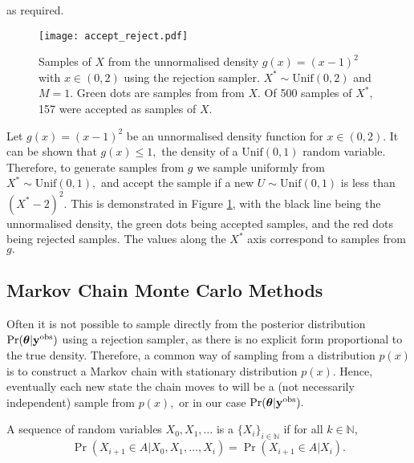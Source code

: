 as required.

\begin{figure}
    \centering
    \texttt{[image: accept\_reject.pdf]}
    \caption[{
        Samples from an unnormalised density using a rejection sampler
    }]{
        Samples of $X$ from the unnormalised density $g(x) = (x - 1)^2$ with
        $x\in(0,2)$ using the rejection sampler. $X^\ast\sim\mathrm{Unif}(0,2)$
        and $M = 1.$
        Green dots are samples from
        from $X.$
        Of 500 samples of $X^\ast$, 157 were accepted as samples of $X$.
    }
    \label{fig:accept_reject}
\end{figure}

\begin{example}
    Let $g(x) = (x - 1)^2$ be an unnormalised density function for
    $x \in (0,2).$ It can be shown that $g(x) \leq 1,$ 
    the density of a $\mathrm{Unif}(0,1)$ random
    variable. Therefore, to generate samples from $g$ we sample uniformly from
    $X^\ast \sim \mathrm{Unif}(0, 1),$ and accept the sample if a new
    $U \sim \mathrm{Unif}(0, 1)$ is less than $(X^\ast - 2)^2.$ This is
    demonstrated in Figure \ref{fig:accept_reject}, with the black line being
    the unnormalised density, the green dots being accepted samples, and the red
    dots being rejected samples. The values along the $X^\ast$ axis correspond
    to samples from $g.$
\end{example}

\subsection*{Markov Chain Monte Carlo Methods}

Often it is not possible to sample directly from the posterior distribution
$\Pr(\bm{\theta}|\mathbf{y}^{\mathrm{obs}})$ using a rejection sampler, as there is no
explicit form proportional to the true density.
Therefore, a common way of sampling from a distribution $p(x)$ is
to construct a Markov chain with stationary distribution $p(x).$
Hence, eventually each new state the
chain moves to will be a (not necessarily independent) sample from $p(x),$
or in our case $\Pr(\bm{\theta}|\mathbf{y}^{\mathrm{obs}}).$

\begin{definition}
    A sequence of random variables
    $X_0, X_1, \dots$
    is a  $\{X_i\}_{i\in\mathbb{N}}$ if for
    all
    $k\in\mathbb{N}$,
    $$
        \Pr(X_{i+1}\in A|X_0, X_1, \dots, X_i)
        = \Pr(X_{i+1}\in A|X_i).
    $$
\end{definition}

